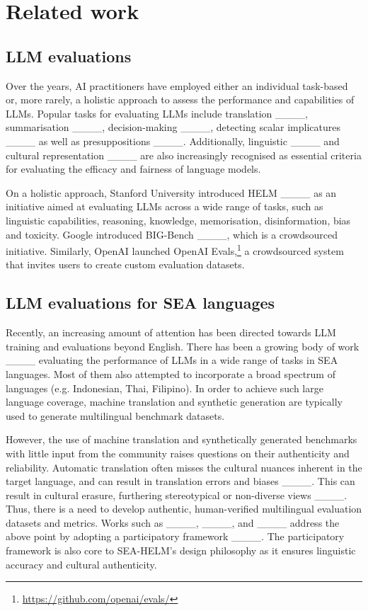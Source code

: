 \section{Related work}
\subsection{LLM evaluations}
Over the years, AI practitioners have employed either an individual task-based or, more rarely, a holistic approach to assess the performance and capabilities of LLMs. Popular tasks for evaluating LLMs include translation ____, summarisation ____, decision-making ____, detecting scalar implicatures ____ as well as presuppositions ____. Additionally, linguistic ____ and cultural representation ____ are also increasingly recognised as essential criteria for evaluating the efficacy and fairness of language models. 

On a holistic approach, Stanford University introduced HELM ____ as an initiative aimed at evaluating LLMs across a wide range of tasks, such as linguistic capabilities, reasoning, knowledge, memorisation, disinformation, bias and toxicity. Google introduced BIG-Bench ____, which is a crowdsourced initiative. Similarly, OpenAI launched OpenAI Evals,\footnote{\url{https://github.com/openai/evals/}} a crowdsourced system that invites users to create custom evaluation datasets.

\subsection{LLM evaluations for SEA languages}

Recently, an increasing amount of attention has been directed towards LLM training and evaluations beyond English. There has been a growing body of work ____ evaluating the performance of LLMs in a wide range of tasks in SEA languages. Most of them also attempted to incorporate a broad spectrum of languages (e.g. Indonesian, Thai, Filipino). In order to achieve such large language coverage, machine translation and synthetic generation are typically used to generate multilingual benchmark datasets.

However, the use of machine translation and synthetically generated benchmarks with little input from the community raises questions on their authenticity and reliability. Automatic translation often misses the cultural nuances inherent in the target language, and can result in translation errors and biases ____. This can result in cultural erasure, furthering stereotypical or non-diverse views ____. Thus, there is a need to develop authentic, human-verified multilingual evaluation datasets and metrics. Works such as ____, ____, and ____
address the above point by adopting a participatory framework 
____. The participatory framework is also core to SEA-HELM's design philosophy as it ensures linguistic accuracy and cultural authenticity.